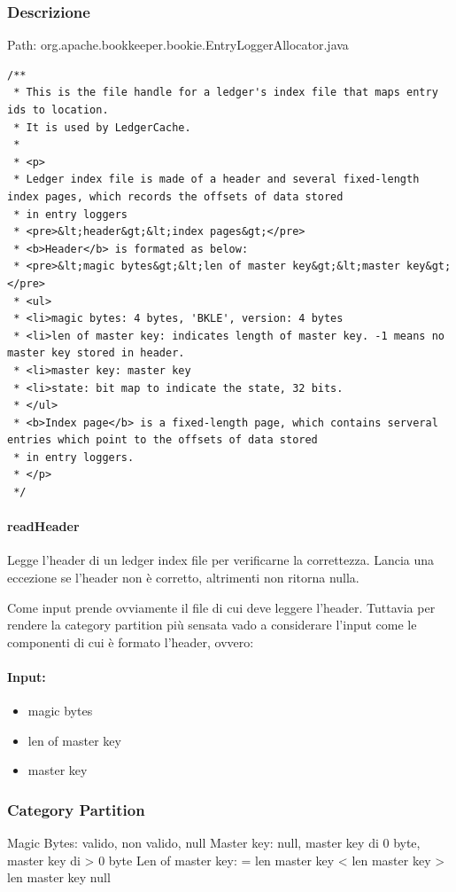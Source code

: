 \documentclass[12pt, a4paper]{article}
\begin{document}
\subsubsection{Descrizione}
Path: org.apache.bookkeeper.bookie.EntryLoggerAllocator.java \\
\begin{verbatim}
/**
 * This is the file handle for a ledger's index file that maps entry ids to location.
 * It is used by LedgerCache.
 *
 * <p>
 * Ledger index file is made of a header and several fixed-length index pages, which records the offsets of data stored
 * in entry loggers
 * <pre>&lt;header&gt;&lt;index pages&gt;</pre>
 * <b>Header</b> is formated as below:
 * <pre>&lt;magic bytes&gt;&lt;len of master key&gt;&lt;master key&gt;</pre>
 * <ul>
 * <li>magic bytes: 4 bytes, 'BKLE', version: 4 bytes
 * <li>len of master key: indicates length of master key. -1 means no master key stored in header.
 * <li>master key: master key
 * <li>state: bit map to indicate the state, 32 bits.
 * </ul>
 * <b>Index page</b> is a fixed-length page, which contains serveral entries which point to the offsets of data stored
 * in entry loggers.
 * </p>
 */
\end{verbatim}

\paragraph{readHeader}
Legge l'header di un ledger index file per verificarne la correttezza.
Lancia una eccezione se l'header non è corretto, altrimenti non ritorna nulla.

Come input prende ovviamente il file di cui deve leggere l'header. Tuttavia per rendere la category partition più sensata
vado a considerare l'input come le componenti di cui è formato l'header, ovvero:
\paragraph{Input:}
\begin{itemize}
  \item magic bytes
  \item len of master key
  \item master key
\end{itemize}

\subsubsection{Category Partition}
Magic Bytes: {valido}, {non valido}, {null}
Master key: {null}, {master key di 0 byte}, {master key di > 0 byte}
Len of master key: { = len master key} {< len master key} {> len master key} {null}
\end{document}

